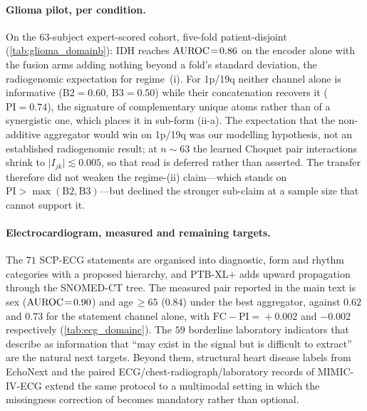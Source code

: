 \paragraph{Glioma pilot, per condition.}
On the $63$-subject expert-scored cohort, five-fold patient-disjoint
(\cref{tab:glioma_domainb}): IDH reaches $\text{AUROC}\!=\!0.86$ on the encoder
alone with the fusion arms adding nothing beyond a fold's standard deviation,
the radiogenomic expectation for regime~(i). For 1p/19q neither channel alone
is informative ($\mathrm{B2}\!=\!0.60$, $\mathrm{B3}\!=\!0.50$) while their
concatenation recovers it ($\mathrm{PI}\!=\!0.74$), the signature of
complementary unique atoms rather than of a synergistic one, which places it
in sub-form (ii-a). The expectation that the non-additive aggregator would
win on 1p/19q was our modelling hypothesis, not an established radiogenomic
result; at $n\!\sim\!63$ the learned Choquet pair interactions shrink to
$\lvert I_{jk}\rvert\!\lesssim\!0.005$, so that read is deferred rather than
asserted. The transfer therefore did not weaken the regime-(ii) claim---which
stands on $\mathrm{PI}\!>\!\max(\mathrm{B2},\mathrm{B3})$---but declined the
stronger sub-claim at a sample size that cannot support it.

\paragraph{Electrocardiogram, measured and remaining targets.}
The $71$ SCP-ECG statements are organised into diagnostic, form and rhythm
categories with a proposed hierarchy,\cite{wagner2020ptbxl} and PTB-XL$+$
adds upward propagation through the SNOMED-CT
tree.\cite{strodthoff2023ptbxlplus} The measured pair reported in the main
text is sex ($\text{AUROC}\!=\!0.90$) and age$\,\geq\!65$ ($0.84$) under the best
aggregator, against $0.62$ and $0.73$ for the statement channel alone, with
$\mathrm{FC}-\mathrm{PI}\!=\!+0.002$ and $-0.002$ respectively
(\cref{tab:ecg_domainc}). The $59$ borderline laboratory indicators that
\citet{xiao2025anyecglab} describe as information that ``may exist in the
signal but is difficult to extract'' are the natural next targets. Beyond
them, structural heart disease labels from EchoNext\cite{hughes2026echonext}
and the paired ECG/chest-radiograph/laboratory records of
MIMIC-IV-ECG\cite{gow2023mimicivecg} extend the same protocol to a
multimodal setting in which the missingness correction of
\citet{choi2025icym2i} becomes mandatory rather than optional.


